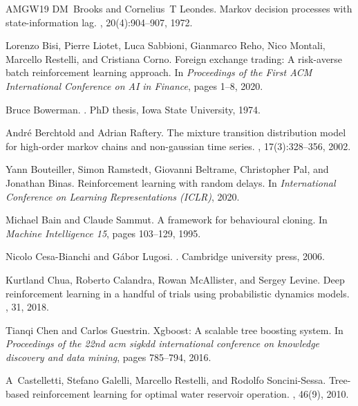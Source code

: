 \begin{thebibliography}{AMGW{\etalchar{+}}19}
DM~Brooks and Cornelius~T Leondes.
\newblock Markov decision processes with state-information lag.
, 20(4):904--907, 1972.

Lorenzo Bisi, Pierre Liotet, Luca Sabbioni, Gianmarco Reho, Nico Montali, Marcello Restelli, and Cristiana Corno.
\newblock Foreign exchange trading: A risk-averse batch reinforcement learning approach.
\newblock In {\em Proceedings of the First ACM International Conference on AI in Finance}, pages 1--8, 2020.

Bruce Bowerman.
.
\newblock PhD thesis, Iowa State University, 1974.

Andr{\'e} Berchtold and Adrian Raftery.
\newblock The mixture transition distribution model for high-order markov chains and non-gaussian time series.
, 17(3):328--356, 2002.

Yann Bouteiller, Simon Ramstedt, Giovanni Beltrame, Christopher Pal, and Jonathan Binas.
\newblock Reinforcement learning with random delays.
\newblock In {\em International Conference on Learning Representations (ICLR)}, 2020.

Michael Bain and Claude Sammut.
\newblock A framework for behavioural cloning.
\newblock In {\em Machine Intelligence 15}, pages 103--129, 1995.

Nicolo Cesa-Bianchi and G{\'a}bor Lugosi.
.
\newblock Cambridge university press, 2006.

Kurtland Chua, Roberto Calandra, Rowan McAllister, and Sergey Levine.
\newblock Deep reinforcement learning in a handful of trials using probabilistic dynamics models.
, 31, 2018.

Tianqi Chen and Carlos Guestrin.
\newblock Xgboost: A scalable tree boosting system.
\newblock In {\em Proceedings of the 22nd acm sigkdd international conference on knowledge discovery and data mining}, pages 785--794, 2016.

A~Castelletti, Stefano Galelli, Marcello Restelli, and Rodolfo Soncini-Sessa.
\newblock Tree-based reinforcement learning for optimal water reservoir operation.
, 46(9), 2010.


\end{thebibliography}
